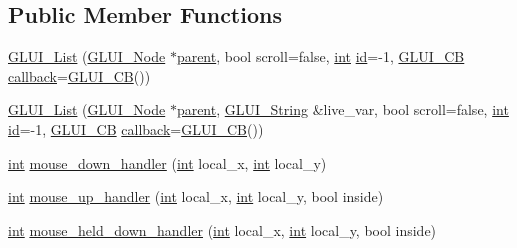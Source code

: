 \subsection*{Public Member Functions}
\begin{DoxyCompactItemize}
\item 
\hyperlink{class_g_l_u_i___list_ab4db3ba18344aa8839022a2ec70eb637}{G\+L\+U\+I\+\_\+\+List} (\hyperlink{class_g_l_u_i___node}{G\+L\+U\+I\+\_\+\+Node} $\ast$\hyperlink{class_g_l_u_i___node_a8ed65d447784f6f88bd3e2e2bcac6cdb}{parent}, bool scroll=false, \hyperlink{wglext_8h_a500a82aecba06f4550f6849b8099ca21}{int} \hyperlink{glext_8h_a58c2a664503e14ffb8f21012aabff3e9}{id}=-\/1, \hyperlink{class_g_l_u_i___c_b}{G\+L\+U\+I\+\_\+\+C\+B} \hyperlink{class_g_l_u_i___control_a96060fe0cc6d537e736dd6eef78e24ab}{callback}=\hyperlink{class_g_l_u_i___c_b}{G\+L\+U\+I\+\_\+\+C\+B}())
\item 
\hyperlink{class_g_l_u_i___list_ae0558ab509470184c35c543c16e33626}{G\+L\+U\+I\+\_\+\+List} (\hyperlink{class_g_l_u_i___node}{G\+L\+U\+I\+\_\+\+Node} $\ast$\hyperlink{class_g_l_u_i___node_a8ed65d447784f6f88bd3e2e2bcac6cdb}{parent}, \hyperlink{glui_8h_aada824856f7bcf29794719981ebd8f60}{G\+L\+U\+I\+\_\+\+String} \&live\+\_\+var, bool scroll=false, \hyperlink{wglext_8h_a500a82aecba06f4550f6849b8099ca21}{int} \hyperlink{glext_8h_a58c2a664503e14ffb8f21012aabff3e9}{id}=-\/1, \hyperlink{class_g_l_u_i___c_b}{G\+L\+U\+I\+\_\+\+C\+B} \hyperlink{class_g_l_u_i___control_a96060fe0cc6d537e736dd6eef78e24ab}{callback}=\hyperlink{class_g_l_u_i___c_b}{G\+L\+U\+I\+\_\+\+C\+B}())
\item 
\hyperlink{wglext_8h_a500a82aecba06f4550f6849b8099ca21}{int} \hyperlink{class_g_l_u_i___list_a5ea7f0e79c85acc1910b13222c2892c4}{mouse\+\_\+down\+\_\+handler} (\hyperlink{wglext_8h_a500a82aecba06f4550f6849b8099ca21}{int} local\+\_\+x, \hyperlink{wglext_8h_a500a82aecba06f4550f6849b8099ca21}{int} local\+\_\+y)
\item 
\hyperlink{wglext_8h_a500a82aecba06f4550f6849b8099ca21}{int} \hyperlink{class_g_l_u_i___list_a7e96dff4df0bfdc5918c54a84f2d5052}{mouse\+\_\+up\+\_\+handler} (\hyperlink{wglext_8h_a500a82aecba06f4550f6849b8099ca21}{int} local\+\_\+x, \hyperlink{wglext_8h_a500a82aecba06f4550f6849b8099ca21}{int} local\+\_\+y, bool inside)
\item 
\hyperlink{wglext_8h_a500a82aecba06f4550f6849b8099ca21}{int} \hyperlink{class_g_l_u_i___list_a2ab77fda1915950e01bea87a45013311}{mouse\+\_\+held\+\_\+down\+\_\+handler} (\hyperlink{wglext_8h_a500a82aecba06f4550f6849b8099ca21}{int} local\+\_\+x, \hyperlink{wglext_8h_a500a82aecba06f4550f6849b8099ca21}{int} local\+\_\+y, bool inside)

\end{DoxyCompactItemize}

